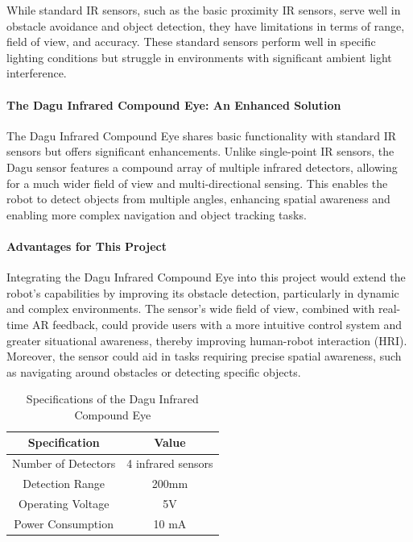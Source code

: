 While standard IR sensors, such as the basic proximity IR sensors, serve well in obstacle avoidance and object detection, they have limitations in terms of range, field of view, and accuracy. These standard sensors perform well in specific lighting conditions but struggle in environments with significant ambient light interference.

\paragraph{The Dagu Infrared Compound Eye: An Enhanced Solution}
The Dagu Infrared Compound Eye shares basic functionality with standard IR sensors but offers significant enhancements. Unlike single-point IR sensors, the Dagu sensor features a compound array of multiple infrared detectors, allowing for a much wider field of view and multi-directional sensing. This enables the robot to detect objects from multiple angles, enhancing spatial awareness and enabling more complex navigation and object tracking tasks.

\paragraph{Advantages for This Project}
Integrating the Dagu Infrared Compound Eye into this project would extend the robot's capabilities by improving its obstacle detection, particularly in dynamic and complex environments. The sensor’s wide field of view, combined with real-time AR feedback, could provide users with a more intuitive control system and greater situational awareness, thereby improving human-robot interaction (HRI). Moreover, the sensor could aid in tasks requiring precise spatial awareness, such as navigating around obstacles or detecting specific objects.

\begin{table}[ht]
\centering
\caption{Specifications of the Dagu Infrared Compound Eye}
\begin{tabular}{|c|c|}
\hline
\textbf{Specification} & \textbf{Value} \\ \hline
Number of Detectors & 4 infrared sensors \\ \hline
Detection Range & 200mm \\ \hline
Operating Voltage & 5V \\ \hline
Power Consumption & 10 mA \\ \hline
\end{tabular}
\label{tab:dagu_infrared}
\end{table}

